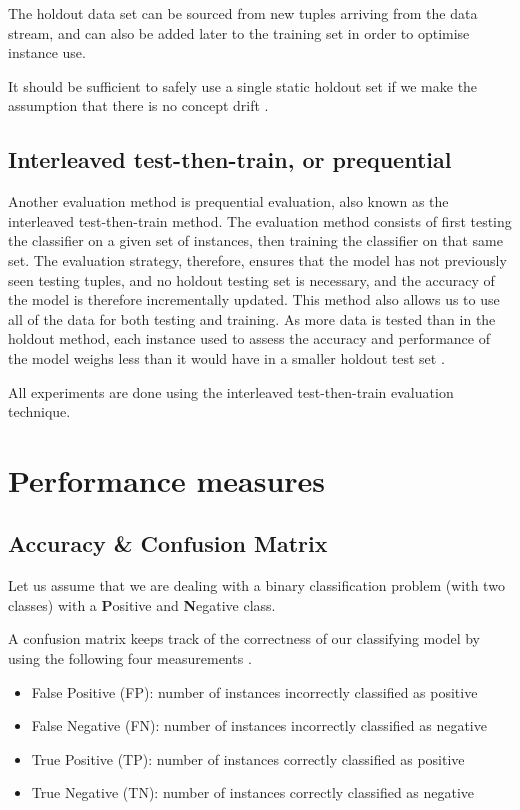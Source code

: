 The holdout data set can be sourced from new tuples arriving from the data stream, and can also be added later to the training set in order to optimise instance use.

It should be sufficient to safely use a single static holdout set if we make the assumption that there is no concept drift \cite{bifet2009data}.

\subsection{Interleaved test-then-train, or prequential\label{section:prequential}}
Another evaluation method is prequential evaluation, also known as the interleaved test-then-train method. The evaluation method consists of first testing the classifier on a given set of instances, then training the classifier on that same set. The evaluation strategy, therefore, ensures that the model has not previously seen testing tuples, and no holdout testing set is necessary, and the accuracy of the model is therefore incrementally updated. This method also allows us to use all of the data for both testing and training. As more data is tested than in the holdout method, each instance used to assess the accuracy and performance of the model weighs less than it would have in a smaller holdout test set \cite{bifet2009data}.

All experiments are done using the interleaved test-then-train evaluation technique.

\section{Performance measures\label{section:performance_measures}}

\subsection{Accuracy \& Confusion Matrix}
Let us assume that we are dealing with a binary classification problem (with two classes) with a \textbf{P}ositive and \textbf{N}egative class.

A confusion matrix keeps track of the correctness of our classifying model by using the following four measurements \cite[77-79]{japkowicz2011evaluating}.

\begin{itemize}
\item False Positive (FP): number of instances incorrectly classified as positive
\item False Negative (FN): number of instances incorrectly classified as negative
\item True Positive (TP): number of instances correctly classified as positive
\item True Negative (TN): number of instances correctly classified as negative
\end{itemize}

